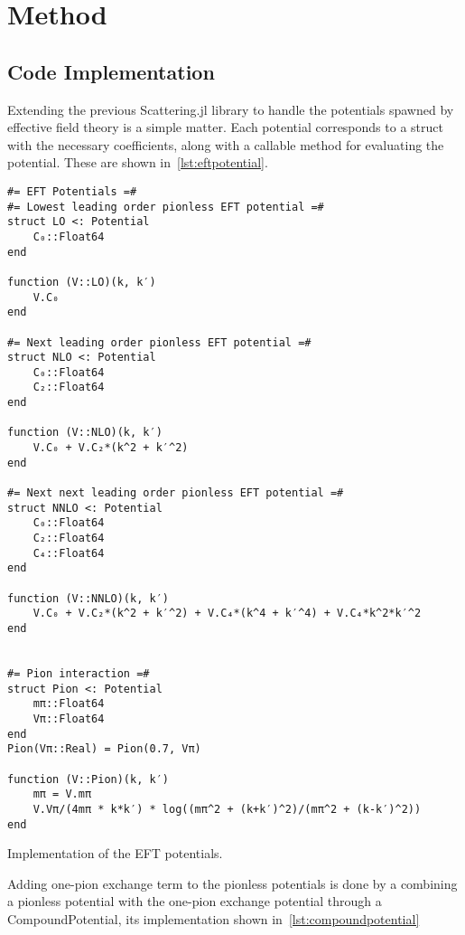 \section{Method}\label{sec:Method}


\subsection{Code Implementation}
Extending the previous \textsf{Scattering.jl} library to handle the potentials
spawned by effective field theory is a simple matter. Each potential corresponds
to a struct with the necessary coefficients, along with a callable method for
evaluating the potential. These are shown in~\cref{lst:eftpotential}.


\begin{listing}
\begin{verbatim}
#= EFT Potentials =#
#= Lowest leading order pionless EFT potential =#
struct LO <: Potential
    C₀::Float64
end

function (V::LO)(k, k′)
    V.C₀
end

#= Next leading order pionless EFT potential =#
struct NLO <: Potential
    C₀::Float64
    C₂::Float64
end

function (V::NLO)(k, k′)
    V.C₀ + V.C₂*(k^2 + k′^2)
end

#= Next next leading order pionless EFT potential =#
struct NNLO <: Potential
    C₀::Float64
    C₂::Float64
    C₄::Float64
end

function (V::NNLO)(k, k′)
    V.C₀ + V.C₂*(k^2 + k′^2) + V.C₄*(k^4 + k′^4) + V.C₄*k^2*k′^2
end


#= Pion interaction =#
struct Pion <: Potential
    mπ::Float64
    Vπ::Float64
end
Pion(Vπ::Real) = Pion(0.7, Vπ)

function (V::Pion)(k, k′)
    mπ = V.mπ
    V.Vπ/(4mπ * k*k′) * log((mπ^2 + (k+k′)^2)/(mπ^2 + (k-k′)^2))
end

\end{verbatim}
\caption{Implementation of the EFT potentials.\label{lst:eftpotential}}
\end{listing}

Adding one-pion exchange term to the pionless potentials is done by a combining
a pionless potential with the one-pion exchange potential through a
\textsf{CompoundPotential}, its implementation shown in~\cref{lst:compoundpotential} 


